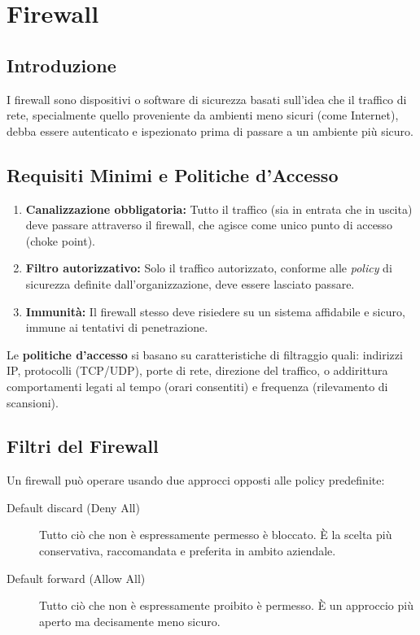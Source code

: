 \chapter{Firewall}

\section{Introduzione}

\begin{defbox}[Firewall]
I firewall sono dispositivi o software di sicurezza basati sull'idea che il traffico di rete, specialmente quello proveniente da ambienti meno sicuri (come Internet), debba essere autenticato e ispezionato prima di passare a un ambiente più sicuro.
\end{defbox}

\section{Requisiti Minimi e Politiche d'Accesso}
\begin{enumerate}
    \item \textbf{Canalizzazione obbligatoria:} Tutto il traffico (sia in entrata che in uscita) deve passare attraverso il firewall, che agisce come unico punto di accesso (choke point).
    \item \textbf{Filtro autorizzativo:} Solo il traffico autorizzato, conforme alle \textit{policy} di sicurezza definite dall'organizzazione, deve essere lasciato passare.
    \item \textbf{Immunità:} Il firewall stesso deve risiedere su un sistema affidabile e sicuro, immune ai tentativi di penetrazione.
\end{enumerate}

Le \textbf{politiche d'accesso} si basano su caratteristiche di filtraggio quali: indirizzi IP, protocolli (TCP/UDP), porte di rete, direzione del traffico, o addirittura comportamenti legati al tempo (orari consentiti) e frequenza (rilevamento di scansioni).

\section{Filtri del Firewall}

Un firewall può operare usando due approcci opposti alle policy predefinite:
\begin{description}
    \item[Default discard (Deny All)] Tutto ciò che non è espressamente permesso è bloccato. È la scelta più conservativa, raccomandata e preferita in ambito aziendale.
    \item[Default forward (Allow All)] Tutto ciò che non è espressamente proibito è permesso. È un approccio più aperto ma decisamente meno sicuro.
\end{description}

